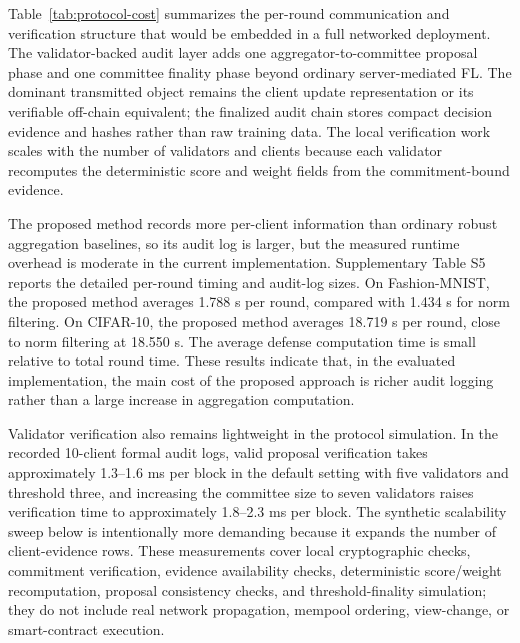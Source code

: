 \documentclass[preprint,12pt]{elsarticle}
\begin{document}
Table~\ref{tab:protocol-cost} summarizes the per-round communication and verification structure that would be embedded in a full networked deployment. The validator-backed audit layer adds one aggregator-to-committee proposal phase and one committee finality phase beyond ordinary server-mediated FL. The dominant transmitted object remains the client update representation or its verifiable off-chain equivalent; the finalized audit chain stores compact decision evidence and hashes rather than raw training data. The local verification work scales with the number of validators and clients because each validator recomputes the deterministic score and weight fields from the commitment-bound evidence.

The proposed method records more per-client information than ordinary robust aggregation baselines, so its audit log is larger, but the measured runtime overhead is moderate in the current implementation. Supplementary Table S5 reports the detailed per-round timing and audit-log sizes. On Fashion-MNIST, the proposed method averages 1.788 s per round, compared with 1.434 s for norm filtering. On CIFAR-10, the proposed method averages 18.719 s per round, close to norm filtering at 18.550 s. The average defense computation time is small relative to total round time. These results indicate that, in the evaluated implementation, the main cost of the proposed approach is richer audit logging rather than a large increase in aggregation computation.

Validator verification also remains lightweight in the protocol simulation. In the recorded 10-client formal audit logs, valid proposal verification takes approximately 1.3--1.6 ms per block in the default setting with five validators and threshold three, and increasing the committee size to seven validators raises verification time to approximately 1.8--2.3 ms per block. The synthetic scalability sweep below is intentionally more demanding because it expands the number of client-evidence rows. These measurements cover local cryptographic checks, commitment verification, evidence availability checks, deterministic score/weight recomputation, proposal consistency checks, and threshold-finality simulation; they do not include real network propagation, mempool ordering, view-change, or smart-contract execution.
\end{document}

